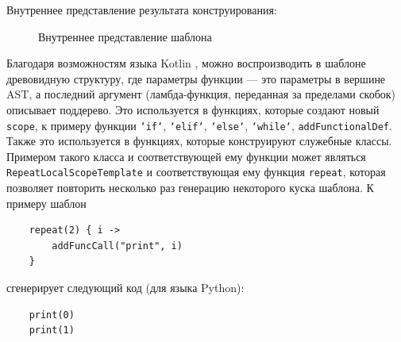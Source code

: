 Внутреннее представление результата конструирования:
\begin{figure}[ht]
    \begin{center}
        \caption{\label{class_tree} Внутреннее представление шаблона}
    \end{center}
\end{figure}

Благодаря возможностям языка Kotlin \cite{kotlin-dsl}, можно воспроизводить в шаблоне древовидную структуру, где параметры
функции --- это параметры в вершине AST, а последний аргумент (ламбда-функция, переданная за пределами скобок)
описывает поддерево. Это используется в функциях, которые создают новый \texttt{scope}, к примеру
функции \texttt{`if`}, \texttt{`elif`}, \texttt{`else`}, \texttt{`while`},
\texttt{addFunctionalDef}. Также это используется в функциях, которые конструируют
служебные классы.
Примером такого класса и соответствующей ему функции может являться \texttt{RepeatLocalScopeTemplate} и
соответствующая ему функция \texttt{repeat}, которая позволяет повторить несколько раз генерацию
некоторого куска шаблона. К примеру шаблон
\begin{verbatim}
    repeat(2) { i ->
        addFuncCall("print", i)
    }
\end{verbatim}

сгенерирует следующий код (для языка Python):

\begin{verbatim}
    print(0)
    print(1)    
\end{verbatim}

